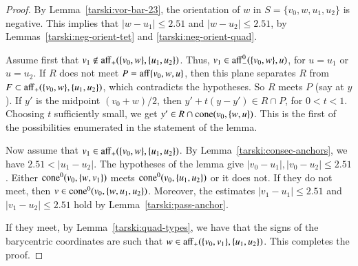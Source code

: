\begin{tarskidata}
\begin{tarski}
\begin{proof}
By Lemma~\ref{tarski:vor-bar-23}, the orientation
of $w$ in $S=\{v_0,w,u_1,u_2\}$ is negative.  This implies that
$|w-u_1|\le 2.51$ and  $|w-u_2|\le 2.51$, by
 Lemmas~\ref{tarski:neg-orient-tet} and \ref{tarski:neg-orient-quad}. 


Assume first that 
$v_1\not\in {\operatorname{aff}}_+(\{v_0,w\},\{u_1,u_2\})$.  
Thus, $v_1\in {\operatorname{aff}}_-^0(\{v_0,w\},u)$, for $u=u_1$ or $u=u_2$.
If $R$ does not meet $P={\operatorname{aff}}\{v_0,w,u\}$, then this plane separates
$R$ from $F\subset {\operatorname{aff}}_+(\{v_0,w\},\{u_1,u_2\})$, which contradicts
the hypotheses.  So $R$ meets $P$ (say at $y$).  
If $y'$ is the midpoint $(v_0+w)/2$, then
$y' + t (y - y')\in R\cap P$, for $0<t<1$.  Choosing $t$ sufficiently
small, we get $y'\in R\cap {\operatorname{cone}}(v_0,\{w,u\})$.
This is the first of the possibilities enumerated in the statement
of the lemma.

Now assume that
$v_1\in {\operatorname{aff}}_+(\{v_0,w\},\{u_1,u_2\})$.  
By Lemma~\ref{tarski:consec-anchors}, we have $2.51<|u_1-u_2|$.
The hypotheses of the lemma give $|v_0-u_1|,|v_0-u_2|\le 2.51$.
Either ${\operatorname{cone}}^0(v_0,\{w,v_1\})$ meets ${\operatorname{cone}}^0(v_0,\{u_1,u_2\})$
or it does not.  If they do not meet, then
$v\in{\operatorname{cone}}^0(v_0,\{w,u_1,u_2\})$.  Moreover, the
estimates $|v_1-u_1|\le 2.51$ and $|v_1-u_2|\le 2.51$ hold
by Lemma~\ref{tarski:pass-anchor}.  %

If they meet, by Lemma~\ref{tarski:quad-types}, we have that
the signs of the barycentric coordinates are such that
$w\in{\operatorname{aff}}_+(\{v_0,v_1\},\{u_1,u_2\})$.  This completes the proof.
\end{proof}
\end{tarski}






\begin{tarski}


\end{tarski}
\end{tarskidata}
